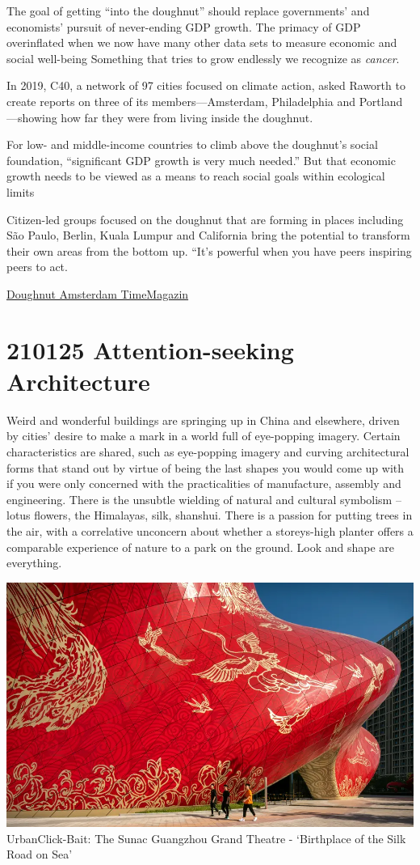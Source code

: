 \documentclass[
]{book}
\begin{document}
The goal of getting ``into the doughnut'' should replace governments' and economists' pursuit of never-ending GDP growth.
The primacy of GDP overinflated when we now have many other data sets to measure economic and social well-being
Something that tries to grow endlessly we recognize as \emph{cancer}.

In 2019, C40, a network of 97 cities focused on climate action, asked Raworth to create reports on three of its members---Amsterdam, Philadelphia and Portland---showing how far they were from living inside the doughnut.

For low- and middle-income countries to climb above the doughnut's social foundation, ``significant GDP growth is very much needed.'' But that economic growth needs to be viewed as a means to reach social goals within ecological limits

Citizen-led groups focused on the doughnut that are forming in places including São Paulo, Berlin, Kuala Lumpur and California bring the potential to transform their own areas from the bottom up. ``It's powerful when you have peers inspiring peers to act.

\href{https://time.com/5930093/amsterdam-doughnut-economics/}{Doughnut Amsterdam TimeMagazin}

\hypertarget{attention-seeking-architecture}{%
\section{210125 Attention-seeking Architecture}\label{attention-seeking-architecture}}

Weird and wonderful buildings are springing up in China and elsewhere, driven by cities' desire to make a mark in a world full of eye-popping imagery.
Certain characteristics are shared, such as eye-popping imagery and curving architectural forms that stand out by virtue of being the last shapes you would come up with if you were only concerned with the practicalities of manufacture, assembly and engineering. There is the unsubtle wielding of natural and cultural symbolism -- lotus flowers, the Himalayas, silk, shanshui. There is a passion for putting trees in the air, with a correlative unconcern about whether a storeys-high planter offers a comparable experience of nature to a park on the ground. Look and shape are everything.

\includegraphics{fig/Sunac_Guangzhou_Grand_Theatre.png}
UrbanClick-Bait: The Sunac Guangzhou Grand Theatre - `Birthplace of the Silk Road on Sea'
\end{document}
